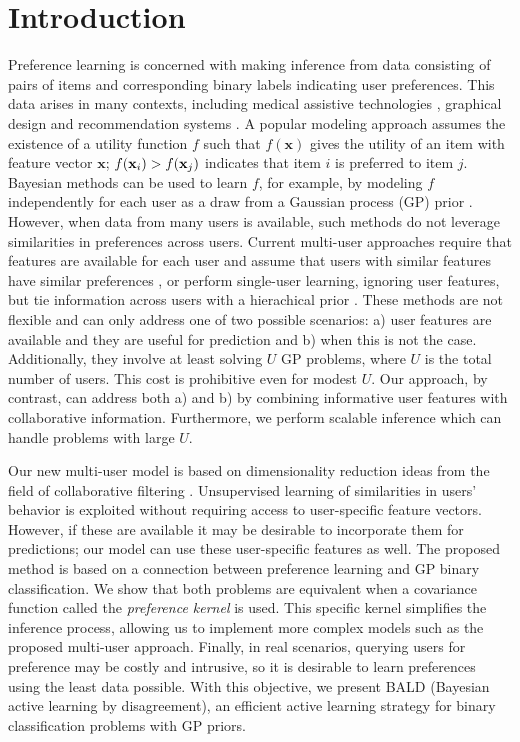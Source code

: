 \section{Introduction}

Preference learning is concerned with making inference from data consisting of
pairs of items and corresponding binary labels indicating user preferences.
This data arises in many contexts, including medical assistive
technologies \cite{birlutiu2009}, graphical design \cite{brochu2007active} and recommendation
systems \cite{de2009}. A popular modeling approach assumes the existence of a utility function
$f$ such that $f(\mathbf{x})$ gives the utility of an item with feature vector $\mathbf{x}$;
$f(\mathbf{x}_i)>f(\mathbf{x}_j)$ indicates that item $i$ is preferred to item $j$.
Bayesian methods can be used to learn $f$, for example, by modeling $f$ independently for each user as a draw from a Gaussian process (GP) prior \cite{chu2005}.
However, when data from many users is available, such methods do not leverage similarities in preferences across users.
Current multi-user approaches require
that features are available for each user and assume that
users with similar features have similar preferences \cite{Bonilla2010},
or perform single-user learning, ignoring user features, but tie information across users with a hierachical prior
\cite{birlutiu2009}. These methods are not flexible and can only
address one of two possible scenarios: a) user features are available and they are useful for prediction and b) when this is not the case.
Additionally, they involve at least solving $U$ GP problems, where $U$ is the total number of users.
This cost is prohibitive even for modest $U$. Our approach, by contrast, can address both a) and b) 
by combining informative user features with collaborative information.
Furthermore, we perform scalable inference which can handle problems with large $U$.

Our new multi-user model is based on
dimensionality reduction ideas from the field of collaborative filtering \cite{stern2009,raiko2007}.
Unsupervised learning of similarities in users' behavior is exploited without requiring access to user-specific feature vectors.
However, if these are available it may be desirable to incorporate them for predictions;
our model can use these user-specific features as well.
The proposed method is based on a connection between preference learning and GP binary classification.
We show that both problems are equivalent when a covariance function called the \emph{preference kernel} is used. 
This specific kernel simplifies the inference process, allowing us to implement more complex models such as the proposed multi-user approach. 
Finally, in real scenarios, querying users for preference may be costly and intrusive, so it is desirable to learn preferences using the least data possible.
With this objective, we present BALD (Bayesian active learning by disagreement),
an efficient active learning strategy for binary classification problems with GP priors.
